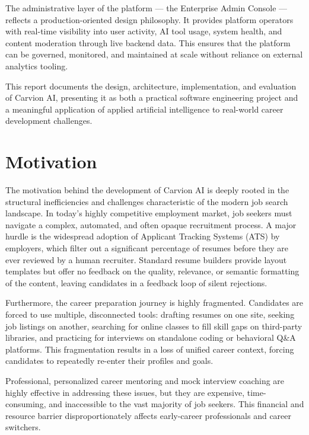 \documentclass[12pt]{article}
\begin{document}
The administrative layer of the platform --- the Enterprise Admin Console --- reflects a production-oriented design philosophy. It provides platform operators with real-time visibility into user activity, AI tool usage, system health, and content moderation through live backend data. This ensures that the platform can be governed, monitored, and maintained at scale without reliance on external analytics tooling.

This report documents the design, architecture, implementation, and evaluation of Carvion AI, presenting it as both a practical software engineering project and a meaningful application of applied artificial intelligence to real-world career development challenges.

\clearpage
\section{Motivation}

The motivation behind the development of Carvion AI is deeply rooted in the structural inefficiencies and challenges characteristic of the modern job search landscape. In today’s highly competitive employment market, job seekers must navigate a complex, automated, and often opaque recruitment process. A major hurdle is the widespread adoption of Applicant Tracking Systems (ATS) by employers, which filter out a significant percentage of resumes before they are ever reviewed by a human recruiter. Standard resume builders provide layout templates but offer no feedback on the quality, relevance, or semantic formatting of the content, leaving candidates in a feedback loop of silent rejections.

Furthermore, the career preparation journey is highly fragmented. Candidates are forced to use multiple, disconnected tools: drafting resumes on one site, seeking job listings on another, searching for online classes to fill skill gaps on third-party libraries, and practicing for interviews on standalone coding or behavioral Q&A platforms. This fragmentation results in a loss of unified career context, forcing candidates to repeatedly re-enter their profiles and goals.

Professional, personalized career mentoring and mock interview coaching are highly effective in addressing these issues, but they are expensive, time-consuming, and inaccessible to the vast majority of job seekers. This financial and resource barrier disproportionately affects early-career professionals and career switchers.
\end{document}
